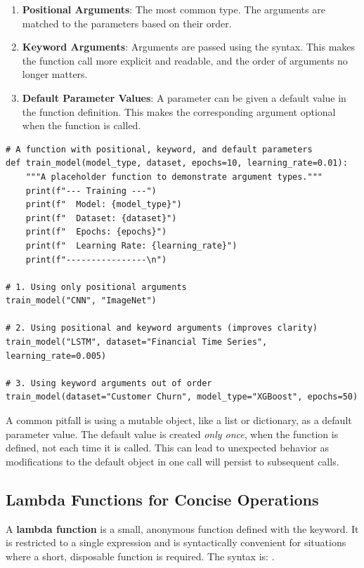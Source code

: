 \begin{enumerate}
    \item \textbf{Positional Arguments}: The most common type. The arguments are matched to the parameters based on their order.
    \item \textbf{Keyword Arguments}: Arguments are passed using the  syntax. This makes the function call more explicit and readable, and the order of arguments no longer matters.
    \item \textbf{Default Parameter Values}: A parameter can be given a default value in the function definition. This makes the corresponding argument optional when the function is called.
\end{enumerate}

\begin{example}
\text{ }\begin{verbatim}
# A function with positional, keyword, and default parameters
def train_model(model_type, dataset, epochs=10, learning_rate=0.01):
    """A placeholder function to demonstrate argument types."""
    print(f"--- Training ---")
    print(f"  Model: {model_type}")
    print(f"  Dataset: {dataset}")
    print(f"  Epochs: {epochs}")
    print(f"  Learning Rate: {learning_rate}")
    print(f"----------------\n")

# 1. Using only positional arguments
train_model("CNN", "ImageNet")

# 2. Using positional and keyword arguments (improves clarity)
train_model("LSTM", dataset="Financial Time Series", learning_rate=0.005)

# 3. Using keyword arguments out of order
train_model(dataset="Customer Churn", model_type="XGBoost", epochs=50)
\end{verbatim}
\end{example}

\begin{remark}
A common pitfall is using a mutable object, like a list or dictionary, as a default parameter value. The default value is created \textit{only once}, when the function is defined, not each time it is called. This can lead to unexpected behavior as modifications to the default object in one call will persist to subsequent calls.
\end{remark}

\subsection{Lambda Functions for Concise Operations}
\label{subsec:lambda}
A \textbf{lambda function} is a small, anonymous function defined with the  keyword. It is restricted to a single expression and is syntactically convenient for situations where a short, disposable function is required.
The syntax is: .

